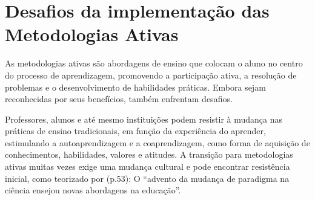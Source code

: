 \section{Desafios da implementação das Metodologias Ativas}

As metodologias ativas são abordagens de ensino que colocam o aluno no centro do processo de aprendizagem, promovendo a participação ativa, a resolução de problemas e o desenvolvimento de habilidades práticas. Embora sejam reconhecidas por seus benefícios, também enfrentam desafios.

Professores, alunos e até mesmo instituições podem resistir à mudança nas práticas de ensino tradicionais, em função da experiência do aprender, estimulando a autoaprendizagem e a coaprendizagem, como forma de aquisição de conhecimentos, habilidades, valores e atitudes.  A transição para metodologias ativas muitas vezes exige uma mudança cultural e pode encontrar resistência inicial, como teorizado por  (p.53): O ``advento da mudança de paradigma na ciência ensejou novas abordagens na educação''.

